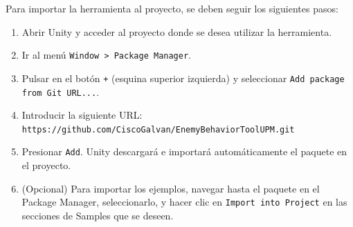 Para importar la herramienta al proyecto, se deben seguir los siguientes pasos:

\begin{enumerate}
  \item Abrir Unity y acceder al proyecto donde se desea utilizar la herramienta.
  \item Ir al menú \texttt{Window > Package Manager}.
  \item Pulsar en el botón \texttt{+} (esquina superior izquierda) y seleccionar \texttt{Add package from Git URL...}.
  \item Introducir la siguiente URL: \\
  \texttt{https://github.com/CiscoGalvan/EnemyBehaviorToolUPM.git}
  \item Presionar \texttt{Add}. Unity descargará e importará automáticamente el paquete en el proyecto.
  \item (Opcional) Para importar los ejemplos, navegar hasta el paquete en el Package Manager, seleccionarlo, y hacer clic en \texttt{Import into Project} en las secciones de Samples que se deseen.
\end{enumerate}

